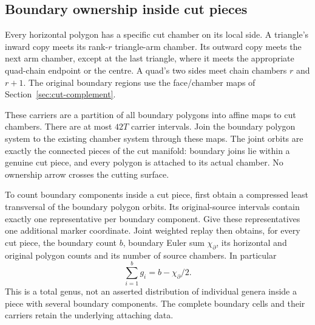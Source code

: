 \subsection{Boundary ownership inside cut pieces}

Every horizontal polygon has a specific cut chamber on its local side.
A triangle's inward copy meets its rank-$r$ triangle-arm chamber. Its
outward copy meets the next arm chamber, except at the last triangle,
where it meets the appropriate quad-chain endpoint or the centre. A quad's
two sides meet chain chambers $r$ and $r+1$. The original boundary regions
use the face/chamber maps of Section~\ref{sec:cut-complement}.

These carriers are a partition of all boundary polygons into affine maps
to cut chambers. There are at most $42T$ carrier intervals. Join the
boundary polygon system to the existing chamber system through these maps.
The joint orbits are exactly the connected pieces of the cut manifold:
boundary joins lie within a genuine cut piece, and every polygon is attached
to its actual chamber. No ownership arrow crosses the cutting surface.

To count boundary components inside a cut piece, first obtain a compressed
least transversal of the boundary polygon orbits. Its original-source
intervals contain exactly one representative per boundary component.
Give these representatives one additional marker coordinate. Joint weighted
replay then obtains, for every cut piece, the boundary count $b$, boundary
Euler sum $\chi_\partial$, its horizontal and original polygon counts and
its number of source chambers. In particular
\[
              \sum_{i=1}^{b}g_i=b-\chi_\partial/2.
\]
This is a total genus, not an asserted distribution of individual genera
inside a piece with several boundary components. The complete boundary
cells and their carriers retain the underlying attaching data.

